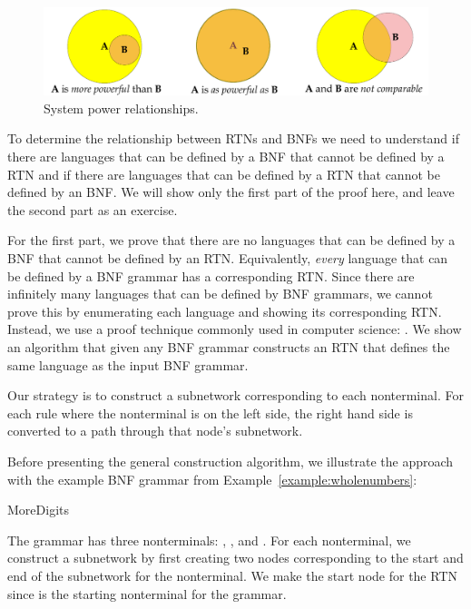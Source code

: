 {\begin{figure}[bth]\centering
\includegraphics[width=5.0in]{figures/language-power.pdf}
\caption{System power relationships.}\label{fig:language-power}
\end{figure}
To determine the relationship between RTNs and BNFs we need to understand if there are languages that can be defined by a BNF that cannot be defined by a RTN and if there are languages that can be defined by a RTN that cannot be defined by an BNF.  We will show only the first part of the proof here, and leave the second part as an exercise.

For the first part, we prove that there are no languages that can be defined by a BNF that cannot be defined by an RTN.  Equivalently, \emph{every} language that can be defined by a BNF grammar has a corresponding RTN.  Since there are infinitely many languages that can be defined by BNF grammars, we cannot prove this by enumerating each language and showing its corresponding RTN.  Instead, we use a proof technique commonly used in computer science: .  We show an algorithm that given any BNF grammar constructs an RTN that defines the same language as the input BNF grammar.  

Our strategy is to construct a subnetwork corresponding to each nonterminal.  For each rule where the nonterminal is on the left side, the right hand side is converted to a path through that node's subnetwork.  

Before presenting the general construction algorithm, we illustrate the approach with the example BNF grammar from Example~\ref{example:wholenumbers}:

\begin{bnfgrammarm}{MoreDigits}
\end{bnfgrammarm}

The grammar has three nonterminals: , , and .  For each nonterminal, we construct a subnetwork by first creating two nodes corresponding to the start and end of the subnetwork for the nonterminal.  We make  the start node for the RTN since  is the starting nonterminal for the grammar.  

}
